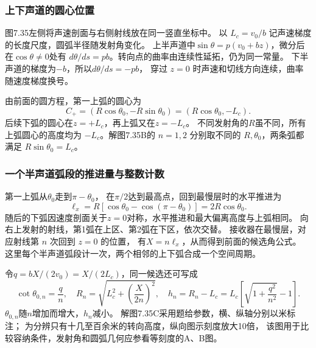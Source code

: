 \documentclass[UTF8,fontset=fandol,a4paper,11pt]{ctexart}
\begin{document}
\subsubsection*{上下声道的圆心位置}
图7.35左侧将声速剖面与右侧射线放在同一竖直坐标中。
以 $L_c=v_0/b$ 记声速梯度的长度尺度，圆弧半径随发射角变化。
上半声道中$\sin\theta=p(v_0+bz)$，微分后在$\cos\theta\ne0$处有
$d\theta/ds=pb$。转向点的曲率由连续性延拓，仍为同一常量。
下半声道的梯度为$-b$，所以$d\theta/ds=-pb$，
穿过 $z=0$ 时声速和切线方向连续，曲率随速度梯度换号。

由前面的圆方程，第一上弧的圆心为
\[
C_+=(R\cos\theta_0,-R\sin\theta_0)
=(R\cos\theta_0,-L_c).
\]
后续下弧的圆心在$z=+L_c$，再上弧又在$z=-L_c$。
不同发射角的$R$虽不同，所有上弧圆心的高度均为 $-L_c$。解图7.35B的 $n=1,2$ 分别取不同的 $R,\theta_0$，两条弧都满足 $R\sin\theta_0=L_c$。

\subsubsection*{一个半声道弧段的推进量与整数计数}
第一上弧从$\theta_0$走到$\pi-\theta_0$，
在$\pi/2$达到最高点，回到最慢层时的水平推进为
\[
\ell_x=R[\cos\theta_0-\cos(\pi-\theta_0)]
=2R\cos\theta_0.
\]
随后的下弧因速度剖面关于$z=0$对称，水平推进和最大偏离高度与上弧相同。
向右上发射的射线，第1弧在上区、第2弧在下区，依次交替。
接收器在最慢层，对应射线第 $n$ 次回到 $z=0$ 的位置，
有$X=n\ell_x$，从而得到前面的候选角公式。
这里每个半声道弧段计一次，两个相邻的上下弧合成一个空间周期。

令$q=bX/(2v_0)=X/(2L_c)$，同一候选还可写成
\[
\cot\theta_{0,n}=\frac qn,\quad
R_n=\sqrt{L_c^2+\left(\frac X{2n}\right)^2},\quad
h_n=R_n-L_c=L_c\left[\sqrt{1+\frac{q^2}{n^2}}-1\right].
\]
$\theta_{0,n}$随$n$增加而增大，$h_n$减小。
解图7.35C采用题给参数，横、纵轴分别以米标注；
为分辨只有十几至百余米的转向高度，纵向图示刻度放大10倍，
该图用于比较容纳条件，发射角和圆弧几何应参看等刻度的A、B图。
\end{document}
